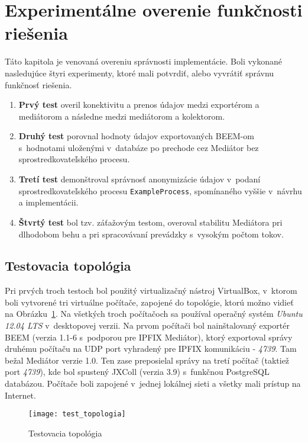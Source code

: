 \section{Experimentálne overenie funkčnosti riešenia} \label{sec:experimenty}

Táto kapitola je venovaná overeniu správnosti implementácie. Boli vykonané nasledujúce štyri experimenty, 
ktoré mali potvrdiť, alebo vyvrátiť správnu funkčnosť riešenia. 
\begin{enumerate}
 \item \textbf{Prvý test} overil konektivitu a prenos údajov medzi exportérom a mediátorom a následne medzi 
 mediátorom a kolektorom.
 \item \textbf{Druhý test} porovnal hodnoty údajov exportovaných BEEM-om s~hodnotami uloženými v~databáze po prechode
 cez Mediátor bez sprostredkovateľského procesu.
 \item \textbf{Tretí test} demonštroval správnosť anonymizácie údajov v~podaní sprostredkovateľského procesu 
 \verb|ExampleProcess|, spomínaného vyššie v~návrhu a implementácii.
 \item \textbf{Štvrtý test} bol tzv. záťažovým testom, overoval stabilitu Mediátora pri dlhodobom behu a 
 pri spracovávaní prevádzky s~vysokým počtom tokov.
\end{enumerate}


\subsection{Testovacia topológia}

Pri prvých troch testoch bol použitý virtualizačný nástroj VirtualBox, v~ktorom boli vytvorené tri virtuálne 
počítače, zapojené do topológie, ktorú možno vidieť na Obrázku~\ref{o:test_topologia}.
Na všetkých troch počítačoch sa používal operačný systém \emph{Ubuntu 12.04 LTS} v~desktopovej verzii. Na 
prvom počítači bol nainštalovaný exportér BEEM (verzia 1.1-6 s~podporou pre IPFIX Mediátor), ktorý 
exportoval správy druhému počítaču na UDP port vyhradený pre IPFIX komunikáciu - \emph{4739}. Tam bežal 
Mediátor verzie 1.0. Ten zase preposielal správy na tretí počítač (taktiež port \emph{4739}), kde bol 
spustený JXColl (verzia 3.9) s~funkčnou PostgreSQL databázou. Počítače boli zapojené v~jednej 
lokálnej sieti a všetky mali prístup na Internet.

\begin{figure}[ht!]
\centering
\texttt{[image: test\_topologia]}
\caption{Testovacia topológia}\label{o:test_topologia}
\end{figure}

